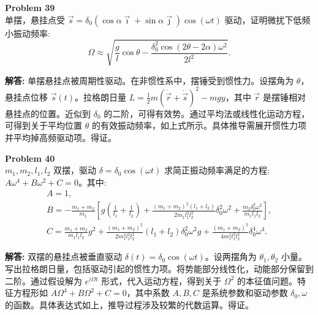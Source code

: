 \documentclass[12pt, a4paper, oneside]{ctexart}
\newenvironment{solution}{\par\noindent\textbf{解答:}\quad}{\par}
\begin{document}
\begin{mdframed}[backgroundcolor=gray!10, linewidth=0pt]
    \textbf{Problem 39} \\
    单摆，悬挂点受 \(\vec{s} = \delta_0(\cos\alpha\vec{\imath} + \sin\alpha\vec{\jmath})\cos(\omega t)\) 驱动，证明微扰下低频小振动频率:
    \[
    \Omega \approx \sqrt{\frac{g}{l} \cos\theta - \frac{\delta_0^2 \cos(2\theta-2\alpha)\omega^2}{2 l^2}}.
    \]
\end{mdframed}
\begin{solution}
    单摆悬挂点被周期性驱动。在非惯性系中，摆锤受到惯性力。设摆角为 \(\theta\)，悬挂点位移 \(\vec{s}(t)\)。拉格朗日量 \(L = \frac{1}{2} m (\dot{\vec{r}} + \dot{\vec{s}})^2 - m g y\)，其中 \(\vec{r}\) 是摆锤相对悬挂点的位置。近似到 \(\delta_0\) 的二阶，可得有效势。通过平均法或线性化运动方程，可得到关于平均位置 \(\theta\) 的有效振动频率，如上式所示。具体推导需展开惯性力项并平均掉高频驱动项。得证。
\end{solution}

\begin{mdframed}[backgroundcolor=gray!10, linewidth=0pt]
    \textbf{Problem 40} \\
    \(m_1, m_2, l_1, l_2\) 双摆，驱动 \(\delta = \delta_0 \cos(\omega t)\) 求简正振动频率满足的方程: \(A\omega^4 + B\omega^2 + C = 0\)。其中:
    \[
    \begin{gathered}
        A = 1, \\
        B = -\frac{m_1+m_2}{m_1} \left[ g\left(\frac{1}{l_1}+\frac{1}{l_2}\right) + \frac{(m_1+m_2)^2(l_1+l_2)}{2 m_1 l_1^2 l_2^2} \delta_0^2 \omega^2 + \frac{m_2 \delta_0^2 \omega^2}{m_1 l_1 l_2} \right], \\
        C = \frac{m_1+m_2}{m_1 l_1 l_2} g^2 + \frac{(m_1+m_2)^2}{2 m_1^2 l_1^2 l_2^2} (l_1+l_2) \delta_0^2 \omega^2 g + \frac{(m_1+m_2)^2}{4 m_1^2 l_1^2 l_2^2} \delta_0^4 \omega^4.
    \end{gathered}
    \]
\end{mdframed}
\begin{solution}
    双摆的悬挂点被垂直驱动 \(\delta(t) = \delta_0 \cos(\omega t)\)。设两摆角为 \(\theta_1, \theta_2\) 小量。写出拉格朗日量，包括驱动引起的惯性力项。将势能部分线性化，动能部分保留到二阶。通过假设解为 \(e^{i\Omega t}\) 形式，代入运动方程，得到关于 \(\Omega^2\) 的本征值问题。特征方程形如 \(A \Omega^4 + B \Omega^2 + C = 0\)，其中系数 \(A, B, C\) 是系统参数和驱动参数 \(\delta_0, \omega\) 的函数。具体表达式如上，推导过程涉及较繁的代数运算。得证。
\end{solution}
\end{document}

